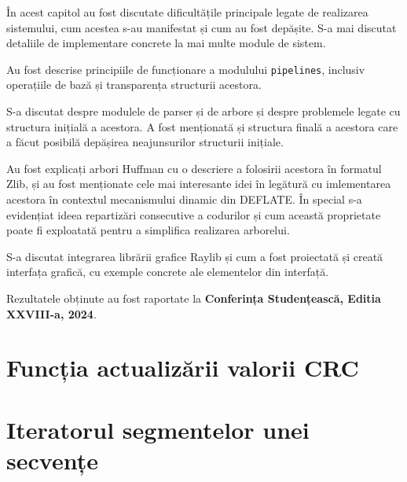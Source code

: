 \documentclass[a4paper,12pt]{report}
\renewcommand{\year}{2024}
\newcommand{\conferencesList}{Conferința Studențească, Editia XXVIII-a, \year}
\begin{document}

În acest capitol au fost discutate dificultățile principale legate de realizarea sistemului,
cum acestea s-au manifestat și cum au fost depășite.
S-a mai discutat detaliile de implementare concrete la mai multe module de sistem.

Au fost descrise principiile de funcționare a modulului \texttt{pipelines},
inclusiv operațiile de bază și transparența structurii acestora.

S-a discutat despre modulele de parser și de arbore
și despre problemele legate cu structura inițială a acestora.
A fost menționată și structura finală a acestora care
a făcut posibilă depășirea neajunsurilor structurii inițiale.

Au fost explicați arbori Huffman cu o descriere a folosirii acestora în formatul Zlib,
și au fost menționate cele mai interesante idei în legătură cu imlementarea acestora
în contextul mecanismului dinamic din DEFLATE.
În special s-a evidențiat ideea repartizări consecutive a codurilor și cum această proprietate poate fi
exploatată pentru a simplifica realizarea arborelui.

S-a discutat integrarea librării grafice Raylib și cum a fost proiectată și creată interfața grafică,
cu exemple concrete ale elementelor din interfață.




Rezultatele obținute au fost raportate la \textbf{\conferencesList}\cite{self}.

\newpage
{}





\appendix


\section{Funcția actualizării valorii CRC}\label{appendix:crc} %

\section{Iteratorul segmentelor unei secvențe}\label{appendix:sequence_iterator} %
\end{document}
